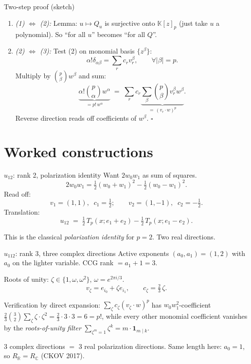 \documentclass[10pt,aspectratio=169]{beamer}
\newcommand{\R}{\mathbb{R}}
\newcommand{\C}{\mathbb{C}}
\newcommand{\K}{\mathbb{K}}
\newcommand{\Tp}{T_p}
\newcommand{\Qu}{Q_u}
\begin{document}
\begin{frame}{Two-step proof (sketch)}
  \begin{enumerate}
    \item \emph{(1) $\Leftrightarrow$ (2):} Lemma: $u\mapsto \Qu$ is surjective onto $\K[z]_p$
          (just take $u$ a polynomial). So ``for all $u$''
          becomes ``for all $Q$''.
    \pause
    \item \emph{(2) $\Leftrightarrow$ (3):} Test (2) on monomial basis $\{z^\beta\}$:
    \[
      \alpha!\delta_{\alpha\beta} = \sum_r c_r v_r^\beta,\qquad \forall|\beta|=p.
    \]
    Multiply by $\binom{p}{\beta}w^\beta$ and sum:
    \[
      \underbrace{\alpha!\binom{p}{\alpha}w^\alpha}_{= p!\,w^\alpha}
      \;=\;
      \sum_r c_r \underbrace{\sum_\beta \binom{p}{\beta}v_r^\beta w^\beta}_{=\,(v_r\cdot w)^p}.
    \]
    Reverse direction reads off coefficients of $w^\beta$. $\square$
  \end{enumerate}
\end{frame}

\section{Worked constructions}

\begin{frame}{$u_{12}$: rank 2, polarization identity}
  Want $2w_0w_1$ as sum of squares.
  \[
    2w_0w_1 = \tfrac12(w_0+w_1)^2 - \tfrac12(w_0-w_1)^2.
  \]
  \pause
  Read off:
  \[
    v_1=(1,1),\;\; c_1=\tfrac12;\qquad v_2=(1,-1),\;\; c_2=-\tfrac12.
  \]
  Translation:
  \[
    \boxed{u_{12} \;=\; \tfrac12\,\Tp(x;e_1+e_2) - \tfrac12\,\Tp(x;e_1-e_2).}
  \]

  \pause
  \medskip
  This is the classical \emph{polarization identity} for $p=2$. Two real directions.
\end{frame}

\begin{frame}{$u_{112}$: rank 3, three complex directions}
  Active exponents $(a_0,a_1)=(1,2)$ with $a_0$ on the lighter variable.
  CCG rank $= a_1+1 = 3$.

  \medskip
  Roots of unity: $\zeta\in\{1,\omega,\omega^2\}$, $\omega=e^{2\pi i/3}$.
  \[
    v_\zeta = e_{i_0}+\zeta e_{i_1},\qquad c_\zeta = \tfrac{2}{3}\,\zeta.
  \]

  \medskip
  Verification by direct expansion:
  $\sum_\zeta c_\zeta (v_\zeta\cdot w)^p$ has $w_0w_1^2$-coefficient
  $\tfrac{2}{3}\binom{3}{2}\sum_\zeta \zeta\cdot \zeta^2 = \tfrac{2}{3}\cdot 3\cdot 3 = 6 = p!$,
  while every other monomial coefficient vanishes by the
  \emph{roots-of-unity filter}
  $\sum_{\zeta^m=1}\zeta^k = m\cdot\mathbf{1}_{m\mid k}$.

  \pause
  \medskip
  \alert{3 complex directions $=$ 3 real polarization directions.}
  Same length here: $a_0=1$, so $R_\R=R_\C$ (CKOV 2017).
\end{frame}
\end{document}
